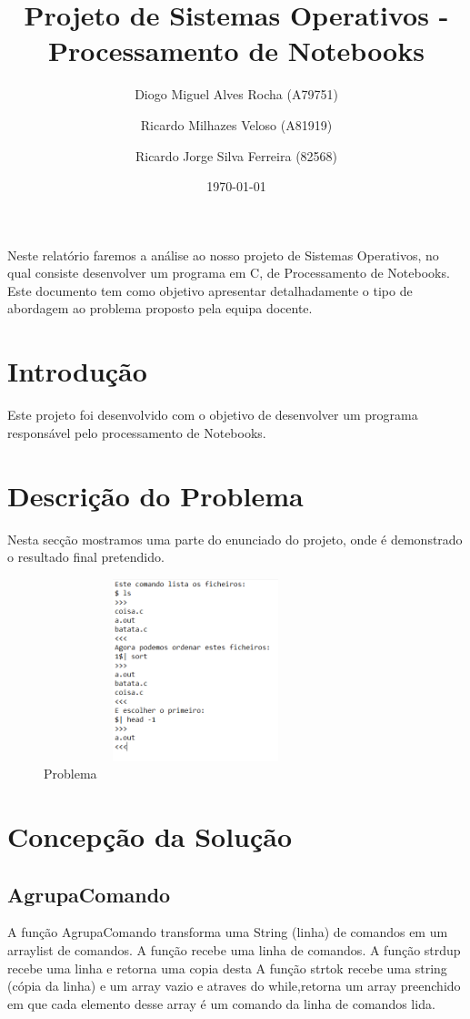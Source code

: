 \documentclass[a4paper]{article}
\title{Projeto de Sistemas Operativos - Processamento de Notebooks }
\author{Diogo Miguel Alves Rocha (A79751)\and Ricardo Milhazes Veloso (A81919) \and Ricardo Jorge Silva Ferreira (82568)}
\date{\today}
\begin{document}
\maketitle

Neste relatório faremos a análise ao nosso projeto de Sistemas Operativos, no qual consiste desenvolver um programa em C, de Processamento de Notebooks. Este documento tem como objetivo apresentar detalhadamente o tipo de abordagem ao problema proposto pela equipa docente.

\tableofcontents

\pagebreak

\section{Introdução}
\label{sec:intro}
Este projeto foi desenvolvido com o objetivo de desenvolver um programa responsável pelo processamento de Notebooks.

\section{Descrição do Problema}
\label{sec:descricao do problema}
Nesta secção mostramos uma parte do enunciado do projeto, onde é demonstrado o resultado final pretendido.

\begin{figure}[H]
				\centering
				\includegraphics[width = 250pt,height = 150pt]{so.png}
				\caption{Problema}
			\end{figure}


\section{Concepção da Solução}
\label{sec:solucao}

\subsection{AgrupaComando}
A função AgrupaComando transforma uma String (linha) de comandos em um arraylist de comandos.
A função recebe uma linha de comandos.
A função strdup recebe uma linha e retorna uma copia desta
A função strtok recebe uma string (cópia da linha) e um array vazio e atraves do while,retorna um array preenchido em que cada elemento desse array é um comando da linha de comandos lida.
\end{document}
